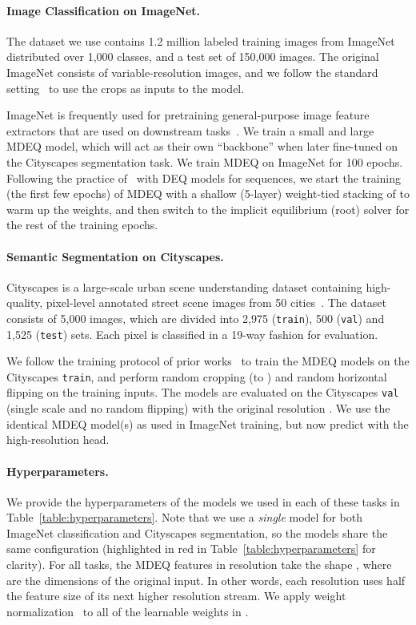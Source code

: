 \documentclass{article}
\begin{document}
\paragraph{Image Classification on ImageNet.} The dataset we use contains 1.2 million labeled training images from ImageNet~\cite{krizhevsky2012imagenet} distributed over 1,000 classes, and a test set of 150,000 images. The original ImageNet consists of variable-resolution images, and we follow the standard setting~\cite{he2016deep} to use the  crops as inputs to the model.

ImageNet is frequently used for pretraining general-purpose image feature extractors that are used on downstream tasks~\cite{he2016deep,zagoruyko2016wide,yu2017dilated,sun2019high}. We train a small and large MDEQ model, which will act as their own ``backbone'' when later fine-tuned on the Cityscapes segmentation task. We train MDEQ on ImageNet for 100 epochs. Following the practice of~\citet{bai2019deep} with DEQ models for sequences, we start the training (the first few epochs) of MDEQ with a shallow (5-layer) weight-tied stacking of  to warm up the weights, and then switch to the implicit equilibrium (root) solver for the rest of the training epochs.

\paragraph{Semantic Segmentation on Cityscapes.} Cityscapes is a large-scale urban scene understanding dataset containing high-quality, pixel-level annotated street scene images from 50 cities~\cite{cordts2016cityscapes}. The dataset consists of 5,000 images, which are divided into 2,975 (\texttt{train}), 500 (\texttt{val}) and 1,525 (\texttt{test}) sets. Each pixel is classified in a 19-way fashion for evaluation.

We follow the training protocol of prior works~\cite{zhao2017pyramid,sun2019high} to train the MDEQ models on the Cityscapes \texttt{train}, and perform random cropping (to ) and random horizontal flipping on the training inputs. The models are evaluated on the Cityscapes \texttt{val} (single scale and no random flipping) with the original resolution . We use the identical MDEQ model(s) as used in ImageNet training, but now predict with the high-resolution head.

\paragraph{Hyperparameters.} We provide the hyperparameters of the models we used in each of these tasks in Table~\ref{table:hyperparameters}. Note that we use a \emph{single} model for both ImageNet classification and Cityscapes segmentation, so the models share the same configuration (highlighted in red in Table~\ref{table:hyperparameters} for clarity). For all tasks, the MDEQ features in resolution  take the shape , where  are the dimensions of the original input. In other words, each resolution uses half the feature size of its next higher resolution stream. We apply weight normalization~\cite{Salimans2016} to all of the learnable weights in .
\end{document}
